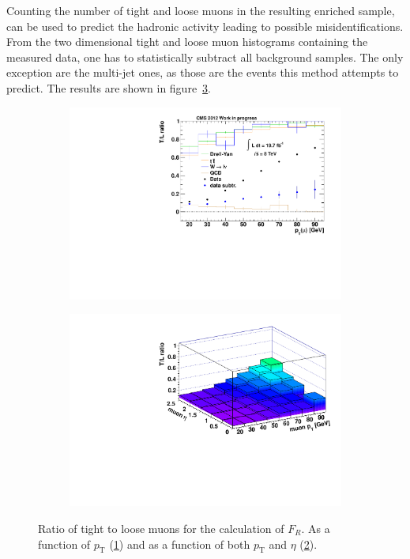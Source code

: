 Counting the number of tight and loose muons in the resulting enriched sample, can be used to predict the hadronic activity leading to possible misidentifications. From the two dimensional tight and loose muon histograms containing the measured data, one has to statistically subtract all background samples. The only exception are the multi-jet ones, as those are the events this method attempts to predict. The results are shown in figure~\ref{fig:tlratios}.
 
\begin{figure}[!htb]
  \centering
  \begin{subfigure}[b]{0.495\textwidth}
    \centering
    \includegraphics[width=\textwidth]{plots/tlratio.pdf}
    \caption{\label{fig:tlratio}}
  \end{subfigure}
  \begin{subfigure}[b]{0.495\textwidth}
    \centering
    \includegraphics[width=\textwidth]{plots/tlratio2d.pdf}
    \caption{\label{fig:tlratio2d}}
  \end{subfigure}

  \caption{Ratio of tight to loose muons for the calculation of $F_R$. As a function of $p_{\text{T}}$ (\ref{fig:tlratio}) and as a function of both $p_{\text{T}}$ and $\eta$ (\ref{fig:tlratio2d}).}
  \label{fig:tlratios}
\end{figure}

